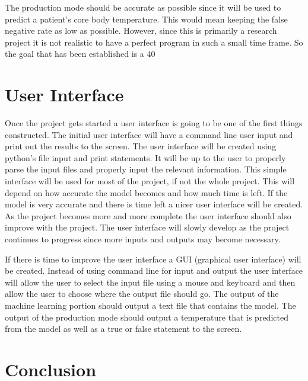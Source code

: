 ﻿\documentclass[onecolumn, draftclsnofoot,10pt, compsoc]{IEEEtran}
\begin{document}
The production mode should be accurate as possible since it will be used to predict a patient's core body temperature. This would mean keeping the false negative rate as low as possible. However, since this is primarily a research project it is not realistic to have a perfect program in such a small time frame. So the goal that has been established is a 40%

\section{User Interface}
Once the project gets started a user interface is going to be one of the first things constructed. The initial user interface will have a command line user input and print out the results to the screen. The user interface will be created using python's file input and print statements. It will be up to the user to properly parse the input files and properly input the relevant information. This simple interface will be used for most of the project, if not the whole project. This will depend on how accurate the model becomes and how much time is left. If the model is very accurate and there is time left a nicer user interface will be created. As the project becomes more and more complete the user interface should also improve with the project. The user interface will slowly develop as the project continues to progress since more inputs and outputs may become necessary.

If there is time to improve the user interface a GUI (graphical user interface) will be created. Instead of using command line for input and output the user interface will allow the user to select the input file using a mouse and keyboard and then allow the user to choose where the output file should go. The output of the machine learning portion should output a text file that contains the model. The output of the production mode should output a temperature that is predicted from the model as well as a true or false statement to the screen.

\section{Conclusion}




\end{document}
